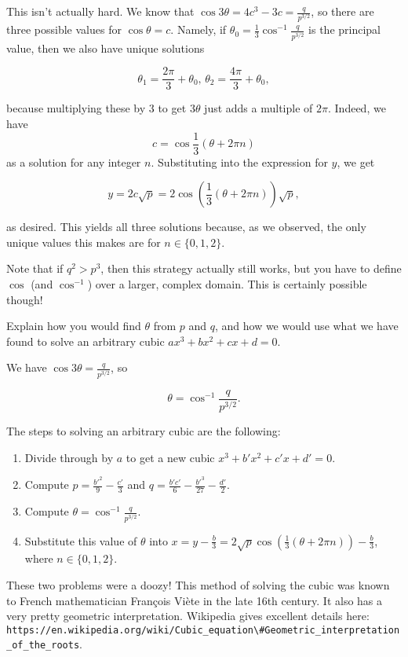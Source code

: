 \documentclass[../key.tex]{subfiles}
\begin{document}
This isn't actually hard. We know that $\cos 3\theta = 4c^3-3c = \frac{q}{p^{3/2}}$, so there are three possible values for $\cos\theta = c$. Namely, if $\theta_0 = \frac{1}{3}\cos^{-1} \frac{q}{p^{3/2}}$ is the principal value, then we also have unique solutions

$$\theta_1 = \frac{2\pi}{3} + \theta_0, \, \theta_2 = \frac{4\pi}{3} + \theta_0,$$

because multiplying these by $3$ to get $3\theta$ just adds a multiple of $2\pi$. Indeed, we have $$c = \cos\frac{1}{3}\left(\theta + 2\pi n\right)$$ as a solution for any integer $n$. Substituting into the expression for $y$, we get

$$y=2c\sqrt{p}=2\cos\left(\frac{1}{3}(\theta + 2\pi n)\right)\sqrt{p},$$

as desired. This yields all three solutions because, as we observed, the only unique values this makes are for $n\in \{0,1,2\}$.

Note that if $q^2 > p^3$, then this strategy actually still works, but you have to define $\cos$ (and $\cos^{-1}$) over a larger, complex domain. This is certainly possible though!

\begin{inner_problem}
\item Explain how you would find $\theta$ from $p$ and $q$, and how we would use what we have found to solve an arbitrary cubic $ax^3+bx^2+cx+d=0$.
\end{inner_problem}

We have $\cos 3\theta = \frac{q}{p^{3/2}}$, so

$$\theta = \cos^{-1} \frac{q}{p^{3/2}}.$$

The steps to solving an arbitrary cubic are the following:

\begin{enumerate}
\item Divide through by $a$ to get a new cubic $x^3 + b'x^2 + c'x + d' = 0$.
\item Compute $p = \frac{b'^2}{9} - \frac{c'}{3}$ and $q=\frac{b'c'}{6} - \frac{b'^3}{27} - \frac{d'}{2}$.
\item Compute $\theta = \cos^{-1} \frac{q}{p^{3/2}}$.
\item Substitute this value of $\theta$ into $x=y-\frac{b}{3}=2\sqrt{p}\cos\left(\frac{1}{3}(\theta+2\pi n)\right)-\frac{b}{3}$, where $n\in \{0,1,2\}$.
\end{enumerate}

These two problems were a doozy! This method of solving the cubic was known to French mathematician François Viète in the late 16th century. It also has a very pretty geometric interpretation. Wikipedia gives excellent details here: \verb|https://en.wikipedia.org/wiki/Cubic_equation\#Geometric_interpretation_of_the_roots|.
\end{document}
